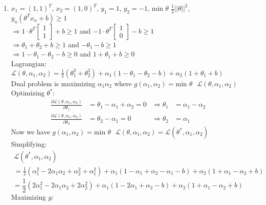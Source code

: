 \documentclass[11pt]{article}
\newcommand{\solution}[1]{{{\color{blue}{\bf Solution:} {#1}}}}
\begin{document}
\begin{enumerate}
\item
\solution{
$x_1 = (1, 1)^T$, $x_2 = (1, 0 )^T$, $y_1 = 1$, $y_2 = -1$, min $\theta$ $\frac{1}{2}||\theta||^2$, $y_n(\theta^Tx_n + b) \geq 1$ \\
$\Rightarrow 1\cdot \theta^T \begin{bmatrix} 1 \\ 1 \end{bmatrix} + b\geq 1$ and $-1\cdot \theta^T \begin{bmatrix} 1 \\ 0 \end{bmatrix} - b\geq 1$ \\
$\Rightarrow \theta_1 + \theta_2 + b\geq 1$ and $-\theta_1 - b\geq 1$ \\
$\Rightarrow 1 - \theta_1 - \theta_2 - b \geq 0$ and $1 + \theta_1 + b\geq 0$ \\
Lagrangian: $\mathcal{L}(\theta,  \alpha_1, \alpha_2) = \frac{1}{2}(\theta_1^2 + \theta_2^2) + \alpha_1(1-\theta_1 - \theta_2 -b) + \alpha_2(1 + \theta_1 + b)$ \\
Dual problem is maximizing $\alpha_1 \alpha_2$ where $g(\alpha_1, \alpha_2) = \text{min }\theta\text{ } \mathcal{L}(\theta, \alpha_1, \alpha_2)$ \\
Optimizing $\theta^*$: \\
\begin{align}
\frac{\partial \mathcal{L}(\theta, \alpha_1, \alpha_2)}{\partial\theta_1} &= \theta_1 - \alpha_1 + \alpha_2 = 0 &\Rightarrow \theta_1 &= \alpha_1 - \alpha_2 \\
\frac{\partial \mathcal{L}(\theta, \alpha_1, \alpha_2)}{\partial\theta_2} &= \theta_2 - \alpha_1 = 0 &\Rightarrow \theta_2 &= \alpha_1
\end{align}
Now we have $g(\alpha_1, \alpha_2) = \text{min }\theta\text{ } \mathcal{L}(\theta, \alpha_1, \alpha_2) = \mathcal{L}(\theta^*, \alpha_1, \alpha_2)$ \\
Simplifying:
\begin{multline}
\mathcal{L}(\theta^*, \alpha_1, \alpha_2) \\ = \frac{1}{2}(\alpha_1^2 - 2\alpha_1\alpha_2 + \alpha_2^2+\alpha_1^2)+\alpha_1(1-\alpha_1+\alpha_2-\alpha_1-b)+\alpha_2(1+\alpha_1-\alpha_2+b)
\end{multline}
\begin{equation}
= \frac{1}{2}(2\alpha_1^2-2\alpha_1\alpha_2+2\alpha_2^2)+\alpha_1(1-2\alpha_1+\alpha_2-b)+\alpha_2(1+\alpha_1-\alpha_2+b)
\end{equation}
Maximizing $g$:
\begin{align}

\end{align}}
\end{enumerate}
\end{document}
